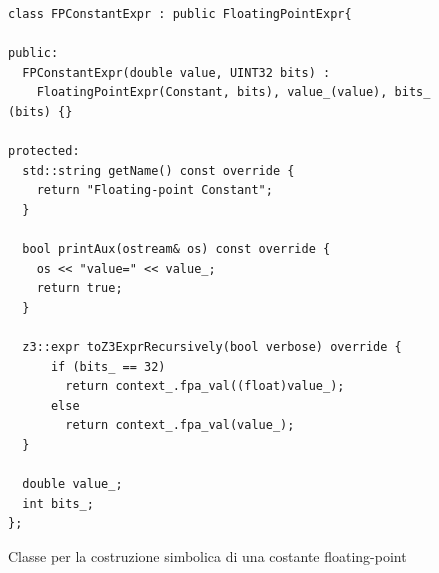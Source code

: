 \documentclass[Lau, oneside]{sapthesis}%
\begin{document}
\begin{figure}[h]
\begin{lstlisting}[xleftmargin=0\textwidth, language=SymQEMU, basicstyle=\footnotesize]
class FPConstantExpr : public FloatingPointExpr{

public:
  FPConstantExpr(double value, UINT32 bits) :
    FloatingPointExpr(Constant, bits), value_(value), bits_ (bits) {}

protected:
  std::string getName() const override {
    return "Floating-point Constant";
  }

  bool printAux(ostream& os) const override {
    os << "value=" << value_;
    return true;
  }

  z3::expr toZ3ExprRecursively(bool verbose) override {
      if (bits_ == 32)
        return context_.fpa_val((float)value_);
      else
        return context_.fpa_val(value_);
  }

  double value_; 
  int bits_;
};
\end{lstlisting}
    \caption{Classe per la costruzione simbolica di una costante floating-point}
    \label{fig:FPConstantExpr}
\end{figure}
\ \\

\newpage
\end{document}
